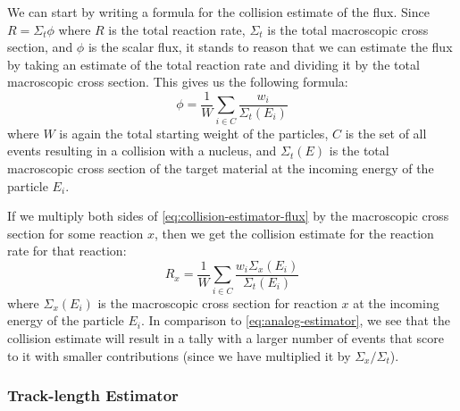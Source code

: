 We can start by writing a formula for the collision estimate of the flux. Since
$R = \Sigma_t \phi$ where $R$ is the total reaction rate,
$\Sigma_t$ is the total macroscopic cross section, and $\phi$ is the
scalar flux, it stands to reason that we can estimate the flux by taking an
estimate of the total reaction rate and dividing it by the total macroscopic
cross section. This gives us the following formula:
\begin{equation}
  \label{eq:collision-estimator-flux}
  \phi = \frac{1}{W} \sum_{i \in C} \frac{w_i}{\Sigma_t (E_i)}
\end{equation}
where $W$ is again the total starting weight of the particles, $C$
is the set of all events resulting in a collision with a nucleus, and
$\Sigma_t (E)$ is the total macroscopic cross section of the target
material at the incoming energy of the particle $E_i$.

If we multiply both sides of \eqref{eq:collision-estimator-flux} by the
macroscopic cross section for some reaction $x$, then we get the collision
estimate for the reaction rate for that reaction:
\begin{equation}
  \label{eq:collision-estimator}
  R_x = \frac{1}{W} \sum_{i \in C} \frac{w_i \Sigma_x (E_i)}{\Sigma_t (E_i)}
\end{equation}
where $\Sigma_x (E_i)$ is the macroscopic cross section for reaction $x$ at the
incoming energy of the particle $E_i$. In comparison to
\eqref{eq:analog-estimator}, we see that the collision estimate will result in a
tally with a larger number of events that score to it with smaller contributions
(since we have multiplied it by $\Sigma_x / \Sigma_t$).

\subsubsection{Track-length Estimator}

